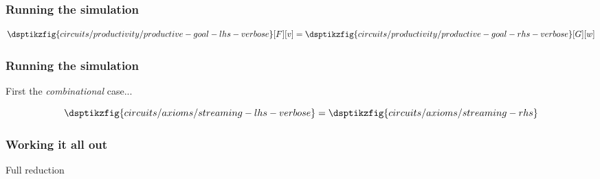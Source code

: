 \begin{frame}
    \frametitle{Running the simulation}

    \centering
    \begin{equation*}
        \dsptikzfig{circuits/productivity/productive-goal-lhs-verbose}[F][v]
        =
        \dsptikzfig{circuits/productivity/productive-goal-rhs-verbose}[G][w]
    \end{equation*}

\end{frame}
\begin{frame}
    \frametitle{Running the simulation}

    First the \emph{combinational} case...

    \centering
    \begin{equation*}
        \dsptikzfig{circuits/axioms/streaming-lhs-verbose}
        =
        \dsptikzfig{circuits/axioms/streaming-rhs}
    \end{equation*}

\end{frame}
\begin{frame}
    \frametitle{Working it all out}

    Full reduction

\end{frame}
